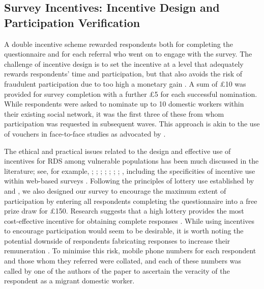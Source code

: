 \documentclass[
  12pt,
  letterpaper,
  DIV=11,
  numbers=noendperiod]{scrartcl}
\theoremstyle{plain}
\theoremstyle{definition}
\begin{document}
\subsection{Survey Incentives: Incentive Design and Participation
Verification}\label{survey-incentives-incentive-design-and-participation-verification}

A double incentive scheme rewarded respondents both for completing the
questionnaire and for each referral who went on to engage with the
survey. The challenge of incentive design is to set the incentive at a
level that adequately rewards respondents' time and participation, but
that also avoids the risk of fraudulent participation due to too high a
monetary gain \autocite{jordan_overcoming_2020}. A sum of £10 was
provided for survey completion with a further £5 for each successful
nomination. While respondents were asked to nominate up to 10 domestic
workers within their existing social network, it was the first three of
these from whom participation was requested in subsequent waves. This
approach is akin to the use of vouchers in face-to-face studies as
advocated by \textcite{thompson_new_2020}.

The ethical and practical issues related to the design and effective use
of incentives for RDS among vulnerable populations has been much
discussed in the literature; see, for example,
\textcite{wang_respondent-driven_2005};
\textcite{abdul-quader_effectiveness_2006};
\textcite{singer_incentives_2006}; \textcite{dejong_ethical_2009};
\textcite{semaan_ethical_2009}; \textcite{brunovskis_untold_2010};
\textcite{semaan_time-space_2010}; \textcite{platt_adapting_2015},
including the specificities of incentive use within web-based surveys
\autocite{cobanoglu_effect_2003}. Following the principles of lottery
use established by \textcite{brown_you_2006} and
\textcite{laguilles_can_2011}, we also designed our survey to encourage
the maximum extent of participation by entering all respondents
completing the questionnaire into a free prize draw for £150. Research
suggests that a high lottery provides the most cost-effective incentive
for obtaining complete responses
\autocite{gajic_cost-effectiveness_2012}. While using incentives to
encourage participation would seem to be desirable, it is worth noting
the potential downside of respondents fabricating responses to increase
their remuneration \autocite{robinson_sampling_2014}. To minimise this
risk, mobile phone numbers for each respondent and those whom they
referred were collated, and each of these numbers was called by one of
the authors of the paper to ascertain the veracity of the respondent as
a migrant domestic worker.
\end{document}
